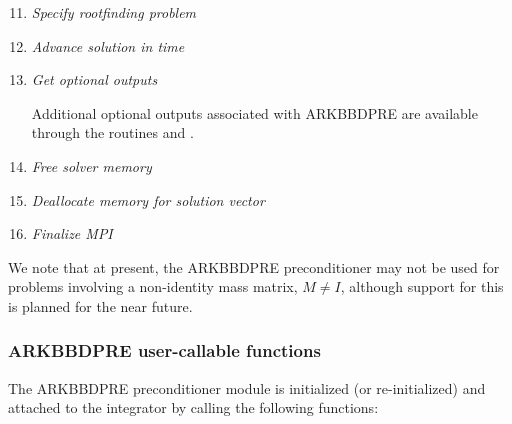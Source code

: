 \documentclass[letterpaper,10pt,english]{sphinxmanual}
\begin{document}
\begin{enumerate}
\setcounter{enumi}{10}
\item {} 
\emph{Specify rootfinding problem}

\item {} 
\emph{Advance solution in time}

\item {} 
\emph{Get optional outputs}

Additional optional outputs associated with ARKBBDPRE are
available through the routines
{\hyperref[c_interface/Preconditioners:c.ARKBBDPrecGetWorkSpace]{\emph{}}} and
{\hyperref[c_interface/Preconditioners:c.ARKBBDPrecGetNumGfnEvals]{\emph{}}}.

\item {} 
\emph{Free solver memory}

\item {} 
\emph{Deallocate memory for solution vector}

\item {} 
\emph{Finalize MPI}

\end{enumerate}

We note that at present, the ARKBBDPRE preconditioner may not be used
for problems involving a non-identity mass matrix, \(M\ne I\),
although support for this is planned for the near future.


\subsubsection{ARKBBDPRE user-callable functions}
\label{c_interface/Preconditioners:arkbbdpre-user-callable-functions}
The ARKBBDPRE preconditioner module is initialized (or re-initialized)
and attached to the integrator by calling the following functions:
\end{document}

